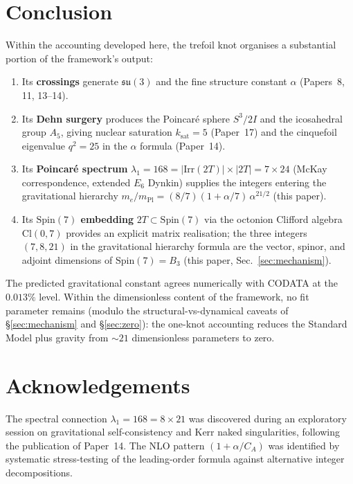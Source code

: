 \documentclass[11pt]{article}
\newcommand{\su}{\mathfrak{su}}
\newcommand{\CA}{C_A}
\begin{document}
\section{Conclusion}
\label{sec:conclusion}

Within the accounting developed here, the trefoil knot organises
a substantial portion of the framework's output:
\begin{enumerate}\setlength\itemsep{2pt}
  \item Its \textbf{crossings} generate $\su(3)$ and the fine
    structure constant $\alpha$ (Papers~8, 11, 13--14).
  \item Its \textbf{Dehn surgery} produces the Poincar\'e sphere
    $S^3/2I$ and the icosahedral group $A_5$, giving nuclear
    saturation $k_\text{sat} = 5$ (Paper~17) and the cinquefoil
    eigenvalue $q^2 = 25$ in the $\alpha$ formula (Paper~14).
  \item Its \textbf{Poincar\'e spectrum} $\lambda_1 = 168 =
    |\mathrm{Irr}(2T)| \times |2T| = 7 \times 24$ (McKay
    correspondence, extended $E_6$ Dynkin) supplies the
    integers entering the gravitational hierarchy
    $m_e/m_\text{Pl} = (8/7)(1{+}\alpha/7)\,\alpha^{21/2}$
    (this paper).
  \item Its \textbf{$\mathrm{Spin}(7)$ embedding} $2T \subset
    \mathrm{Spin}(7)$ via the octonion Clifford algebra
    $\mathrm{Cl}(0, 7)$ provides an explicit matrix realisation;
    the three integers $(7, 8, 21)$ in the gravitational hierarchy
    formula are the vector, spinor, and adjoint dimensions of
    $\mathrm{Spin}(7) = B_3$ (this paper, Sec.~\ref{sec:mechanism}).
\end{enumerate}

The predicted gravitational constant agrees numerically with
CODATA at the $0.013\%$ level.  Within the dimensionless content
of the framework, no fit parameter remains (modulo the
structural-vs-dynamical caveats of \S\ref{sec:mechanism} and
\S\ref{sec:zero}): the one-knot accounting reduces the Standard
Model plus gravity from $\sim 21$ dimensionless parameters to
zero.

\section*{Acknowledgements}

The spectral connection $\lambda_1 = 168 = 8 \times 21$ was
discovered during an exploratory session on gravitational
self-consistency and Kerr naked singularities, following the
publication of Paper~14.  The NLO pattern $(1 + \alpha/\CA)$
was identified by systematic stress-testing of the leading-order
formula against alternative integer decompositions.
\end{document}
